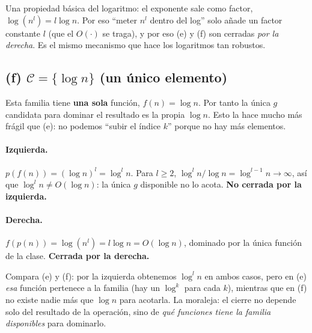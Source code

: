 \documentclass[11pt,a4paper]{article}
\theoremstyle{plain}
\theoremstyle{definition}
\begin{document}
\begin{concepto}[La identidad clave: $\log(n^{l}) = l\log n$]
Una propiedad b\'asica del logaritmo: el exponente sale como factor,
$\log(n^l)=l\log n$. Por eso ``meter $n^l$ dentro del log'' solo a\~nade un factor
constante $l$ (que el $O(\cdot)$ se traga), y por eso (e) y (f) son cerradas \emph{por
la derecha}. Es el mismo mecanismo que hace los logaritmos tan robustos.
\end{concepto}

\subsection*{(f) $\mathcal{C}=\{\log n\}$ (un \'unico elemento)}

\begin{cuidado}
Esta familia tiene \textbf{una sola} funci\'on, $f(n)=\log n$. Por tanto la \'unica
$g$ candidata para dominar el resultado es la propia $\log n$. Esto la hace mucho
m\'as fr\'agil que (e): no podemos ``subir el \'indice $k$'' porque no hay m\'as
elementos.
\end{cuidado}

\paragraph{Izquierda.} $p(f(n)) = (\log n)^{l} = \log^{l} n$. Para $l\geq 2$,
$\log^{l} n / \log n = \log^{l-1} n\to\infty$, as\'i que $\log^{l} n\neq O(\log n)$:
la \'unica $g$ disponible no lo acota. \textbf{No cerrada por la izquierda.}
\paragraph{Derecha.} $f(p(n)) = \log(n^{l}) = l\log n = O(\log n)$, dominado por la
\'unica funci\'on de la clase. \textbf{Cerrada por la derecha.}
\medskip\noindent{}

\begin{porque}
Compara (e) y (f): por la izquierda obtenemos $\log^l n$ en ambos casos, pero en (e)
\emph{esa} funci\'on pertenece a la familia (hay un $\log^k$ para cada $k$), mientras
que en (f) no existe nadie m\'as que $\log n$ para acotarla. La moraleja: el cierre
no depende solo del resultado de la operaci\'on, sino de \emph{qu\'e funciones tiene
la familia disponibles} para dominarlo.
\end{porque}
\end{document}
